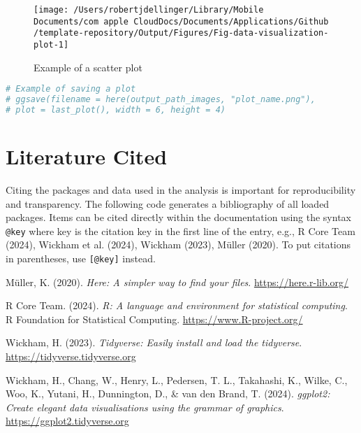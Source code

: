 \documentclass[
  12pt,
]{article}
\newcommand{\passthrough}[1]{#1}
\newlength{\cslhangindent}
\newenvironment{CSLReferences}[2] %
 {\begin{list}{}{%
  \setlength{\itemindent}{0pt}
  \setlength{\leftmargin}{0pt}
  \setlength{\parsep}{0pt}
  \ifodd #1
   \setlength{\leftmargin}{\cslhangindent}
   \setlength{\itemindent}{-1\cslhangindent}
  \fi
  \setlength{\itemsep}{#2\baselineskip}}}
 {\end{list}}
\begin{document}
\begin{figure}

{\centering \texttt{[image: /Users/robertjdellinger/Library/Mobile Documents/com~apple~CloudDocs/Documents/Applications/Github/template-repository/Output/Figures/Fig-data-visualization-plot-1]} 

}

\caption{Example of a scatter plot}\label{fig:data-visualization-plot}
\end{figure}

\begin{lstlisting}[language=R]
# Example of saving a plot
# ggsave(filename = here(output_path_images, "plot_name.png"), 
# plot = last_plot(), width = 6, height = 4)
\end{lstlisting}

\clearpage
\newpage

\section{Literature Cited}\label{literature-cited}

Citing the packages and data used in the analysis is important for
reproducibility and transparency. The following code generates a
bibliography of all loaded packages. Items can be cited directly within
the documentation using the syntax \passthrough{\lstinline!@key!} where
key is the citation key in the first line of the entry, e.g., R Core
Team (2024), Wickham et al. (2024), Wickham (2023), Müller (2020). To
put citations in parentheses, use \passthrough{\lstinline![@key]!}
instead.

\label{refs}
\begin{CSLReferences}{1}{0}
Müller, K. (2020). \emph{Here: A simpler way to find your files}.
\url{https://here.r-lib.org/}

R Core Team. (2024). \emph{R: A language and environment for statistical
computing}. R Foundation for Statistical Computing.
\url{https://www.R-project.org/}

Wickham, H. (2023). \emph{Tidyverse: Easily install and load the
tidyverse}. \url{https://tidyverse.tidyverse.org}

Wickham, H., Chang, W., Henry, L., Pedersen, T. L., Takahashi, K.,
Wilke, C., Woo, K., Yutani, H., Dunnington, D., \& van den Brand, T.
(2024). \emph{ggplot2: Create elegant data visualisations using the
grammar of graphics}. \url{https://ggplot2.tidyverse.org}

\end{CSLReferences}
\end{document}
